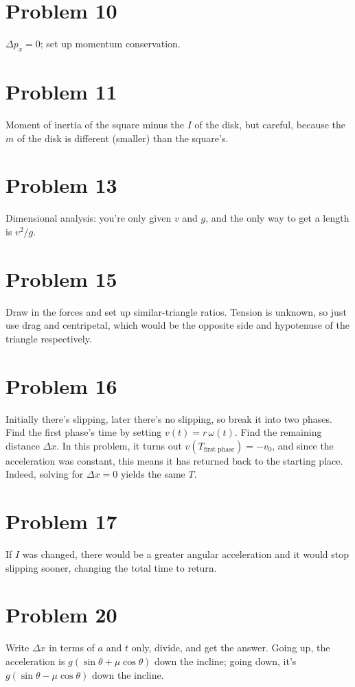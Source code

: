 \documentclass[11pt]{article}
\begin{document}
\section*{Problem 10}
$\Delta p_x=0$; set up momentum conservation.

\section*{Problem 11}
Moment of inertia of the square minus the $I$ of the disk, but careful, because the $m$ of the disk is different (smaller) than the square's.

\section*{Problem 13}
Dimensional analysis: you're only given $v$ and $g$, and the only way to get a length is $v^2/g$.

\section*{Problem 15}
Draw in the forces and set up similar-triangle ratios. Tension is unknown, so just use drag and centripetal, which would be the opposite side and hypotenuse of the triangle respectively.

\section*{Problem 16}
Initially there's slipping, later there's no slipping, so break it into two phases.
Find the first phase's time by setting $v(t)=r\,\omega(t)$.
Find the remaining distance $\Delta x$.
In this problem, it turns out $v(T_{\text{first phase}})=-v_0$, and since the acceleration was constant, this means it has returned back to the starting place.
Indeed, solving for $\Delta x=0$ yields the same $T$.

\section*{Problem 17}
If $I$ was changed, there would be a greater angular acceleration and it would stop slipping sooner, changing the total time to return.

\section*{Problem 20}
Write $\Delta x$ in terms of $a$ and $t$ only, divide, and get the answer.
Going up, the acceleration is $g(\sin\theta+\mu\cos\theta)$ down the incline; going down, it's $g(\sin\theta-\mu\cos\theta)$ down the incline.
\end{document}
